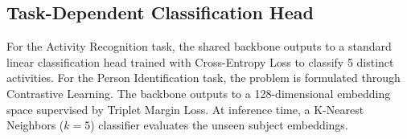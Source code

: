 \subsection{Task-Dependent Classification Head}
For the Activity Recognition task, the shared backbone outputs to a standard linear classification head trained with Cross-Entropy Loss to classify 5 distinct activities. For the Person Identification task, the problem is formulated through Contrastive Learning. The backbone outputs to a 128-dimensional embedding space supervised by Triplet Margin Loss. At inference time, a K-Nearest Neighbors ($k=5$) classifier evaluates the unseen subject embeddings.
